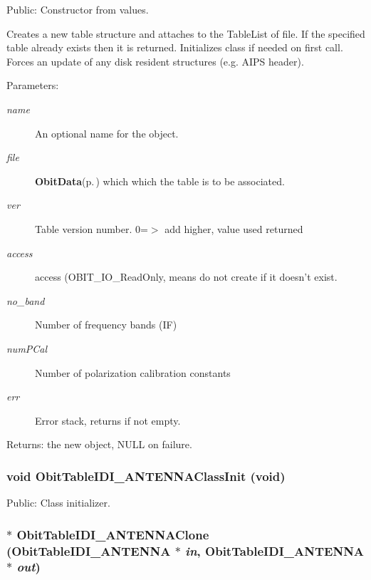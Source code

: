 Public: Constructor from values. 

Creates a new table structure and attaches to the Table\-List of file. If the specified table already exists then it is returned. Initializes class if needed on first call. Forces an update of any disk resident structures (e.g. AIPS header). \begin{Desc}
\item[Parameters:]
\begin{description}
\item[{\em name}]An optional name for the object. \item[{\em file}]{\bf Obit\-Data}{\rm (p.\,\pageref{structObitData})} which which the table is to be associated. \item[{\em ver}]Table version number. 0=$>$ add higher, value used returned \item[{\em access}]access (OBIT\_\-IO\_\-Read\-Only, means do not create if it doesn't exist. \item[{\em no\_\-band}]Number of frequency bands (IF) \item[{\em num\-PCal}]Number of polarization calibration constants \item[{\em err}]Error stack, returns if not empty. \end{description}
\end{Desc}
\begin{Desc}
\item[Returns:]the new object, NULL on failure. \end{Desc}
\subsubsection{\setlength{\rightskip}{0pt plus 5cm}void Obit\-Table\-IDI\_\-ANTENNAClass\-Init (void)}\label{ObitTableIDI__ANTENNA_8h_a10}


Public: Class initializer. 

\subsubsection{$\ast$ Obit\-Table\-IDI\_\-ANTENNAClone ({\bf Obit\-Table\-IDI\_\-ANTENNA} $\ast$ {\em in}, {\bf Obit\-Table\-IDI\_\-ANTENNA} $\ast$ {\em out})}\label{ObitTableIDI__ANTENNA_8h_a15}


